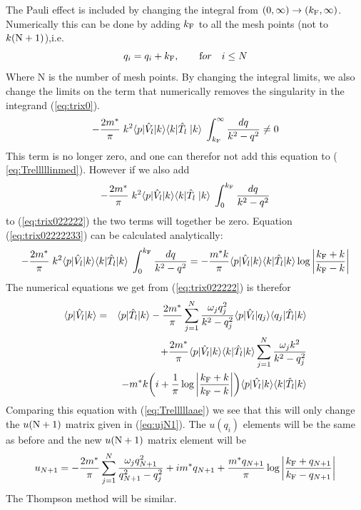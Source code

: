 The Pauli effect is included by changing the integral from $(0,\infty) \to (k_{{\text F}},\infty)$.
Numerically this can be done by adding $k_{{\text F}}$ to all the mesh points (not to $k({{\text N}}+1)$),i.e.
\begin{equation}\label{eq:TM2222233333}
q_i=q_i+k_{{\text F}},\qquad {{\text for}}\quad i\le N
\end{equation}
Where N is the number of mesh points.
By changing the integral limits, we also change the limits on the term that numerically removes the singularity
in the integrand (\ref{eq:trix0}). 
\begin{equation}\label{eq:trix022222}
-\frac{2m^*}{\pi}\;k^2\bra{{ p}}\op{V}_l\ket{{ k}}
\bra{{ k}} \op{T}_l\;\ket{{ k}}\;{\cal }\int^{\infty}_{k_{{\text F}}}\frac{d q}{k^2-{ q^2}}\neq0
\end{equation}
This term is no longer zero, and one can therefor not add this
equation to ( \ref{eq:Trelllllinmed}). However if we also add
\begin{equation}\label{eq:trix02222233}
-\frac{2m^*}{\pi}\;k^2\bra{{ p}}\op{V}_l\ket{{ k}}
\bra{{ k}} \op{T}_l\;\ket{{ k}}\;{\cal }\int^{k_{{\text F}}}_{0}\frac{d q}{k^2-{ q^2}}
\end{equation}
to  (\ref{eq:trix022222}) the two terms will together be zero. Equation (\ref{eq:trix02222233})
can be calculated analytically:
\begin{equation}\label{eq:trix0222223344}
-\frac{2m^*}{\pi}\;k^2\bra{{ p}}\op{V}_l\ket{{ k}}
\bra{{ k}} \op{T}_l\ket{{ k}}\;{\cal }\int^{k_{{\text F}}}_{0}\frac{d q}{k^2-{ q^2}}
=
-\frac{m^*k}{\pi}\bra{{ p}}\op{V}_l\ket{{ k}}
\bra{{ k}} \op{T}_l\ket{{ k}}
\log\bigg|\frac{k_{{\text F}}+k}{k_{{\text F}}-k}\bigg|
\end{equation}
The numerical equations we get from (\ref{eq:trix022222}) is therefor
\begin{eqnarray}\label{eq:Trelllllaae22222222}
\braketm{{ p}}{\op{V}_l}{{ k}}&=&\braketm{{ p}} {\op{T}_l}{{ k}}
- \frac{2m^*}{\pi}\sum^N_{j=1}
\frac{\omega_j q^2_j}{{ k^2}-{ q^2_j}}\bra{{ p}}\op{V}_l\ket{{ q_j}} \bra{{ q_j}} \op{T}_l\ket{{ k}}\nonumber\\
&&+
\frac{2m^*}{\pi}\bra{{ p}}\op{V}_l\ket{{ k}}
\bra{{ k}} \op{T}_l\ket{{ k}}\sum^N_{j=1} \frac{\omega_jk^2}{{ k^2}-{ q^2_j}}\nonumber\\
&&-
m^*k\bigg(i+\frac{1}{\pi}\log\bigg|\frac{k_{{\text F}}+k}{k_{{\text F}}-k}\bigg|\bigg)
\bra{{ p}}\op{V_l}\ket{{ k}}
\bra{{ k}}\op{T}_l\ket{{ k}}
\end{eqnarray}
Comparing this equation with (\ref{eq:Trelllllaae}) we see that this will only change
the $u({{\text N}}+1)$ matrix given in (\ref{eq:ujN1}). The $u(q_i)$ elements will be the same as before and the 
new $u({{\text N}}+1)$ matrix element will be
\begin{equation}\label{eq:ujN1222}
u_{N+1}=-\frac{2m^*}{\pi}\sum^N_{j=1}\frac{\omega_jq^2_{N+1}}{{ q^2_{N+1}}-{ q^2_j}}+  im^* q_{N+1}
+\frac{m^*q_{N+1}}{\pi}\log\bigg|\frac{k_{{\text F}}+q_{N+1}}{k_{{\text F}}-q_{N+1}}\bigg| 
\end{equation}
The Thompson method will be similar.





